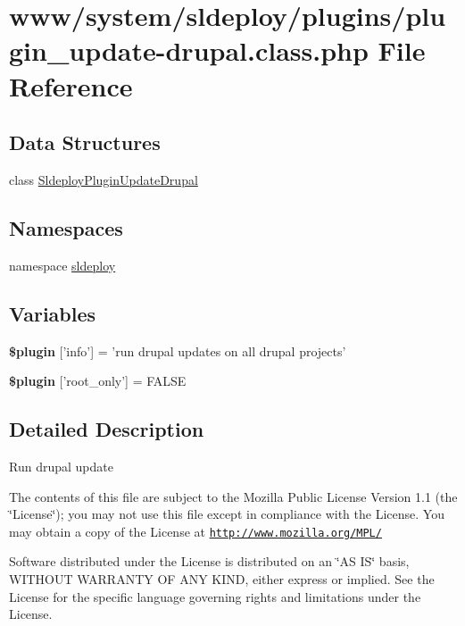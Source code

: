 \hypertarget{plugin__update-drupal_8class_8php}{
\section{www/system/sldeploy/plugins/plugin\_\-update-\/drupal.class.php File Reference}
\label{plugin__update-drupal_8class_8php}
}
\subsection*{Data Structures}
\begin{DoxyCompactItemize}
\item 
class \hyperlink{class_sldeploy_plugin_update_drupal}{SldeployPluginUpdateDrupal}
\end{DoxyCompactItemize}
\subsection*{Namespaces}
\begin{DoxyCompactItemize}
\item 
namespace \hyperlink{namespacesldeploy}{sldeploy}
\end{DoxyCompactItemize}
\subsection*{Variables}
\begin{DoxyCompactItemize}
\item 
\hypertarget{plugin__update-drupal_8class_8php_a95edf69ebbeaeedb03bab3bb010f2af9}{
{\bfseries \$plugin} \mbox{[}'info'\mbox{]} = 'run drupal updates on all drupal projects'}
\label{plugin__update-drupal_8class_8php_a95edf69ebbeaeedb03bab3bb010f2af9}

\item 
\hypertarget{plugin__update-drupal_8class_8php_a1d302084fa15e3efe6c843cbb5096985}{
{\bfseries \$plugin} \mbox{[}'root\_\-only'\mbox{]} = FALSE}
\label{plugin__update-drupal_8class_8php_a1d302084fa15e3efe6c843cbb5096985}

\end{DoxyCompactItemize}


\subsection{Detailed Description}
Run drupal update

The contents of this file are subject to the Mozilla Public License Version 1.1 (the \char`\"{}License\char`\"{}); you may not use this file except in compliance with the License. You may obtain a copy of the License at \href{http://www.mozilla.org/MPL/}{\tt http://www.mozilla.org/MPL/}

Software distributed under the License is distributed on an \char`\"{}AS IS\char`\"{} basis, WITHOUT WARRANTY OF ANY KIND, either express or implied. See the License for the specific language governing rights and limitations under the License. 